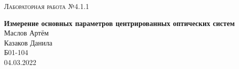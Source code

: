 \documentclass[12pt,a4paper]{extreport}
\begin{document}
	
	\begin{center}
		\large
		\textsc{Лабораторная работа №4.1.1}
		
		\LARGE
		\textbf{Измерение основных параметров центрированных оптических систем}
		\\[5mm]

		\large
		Маслов Артём \\
		Казаков Данила \\
		Б01-104
		\\[3mm]
		04.03.2022
	\end{center}
			
	
	
	

	

	
	
	
	
	
	
\end{document}
